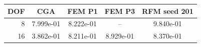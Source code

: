 \begin{tabular}{rcccc}
\toprule
DOF & CGA & FEM P1 & FEM P3 & RFM seed 201 \\
\midrule
8 & 7.999e-01 & 8.222e-01 & -- & 9.840e-01 \\
16 & 3.862e-01 & 8.211e-01 & 8.929e-01 & 8.370e-01 \\
\bottomrule
\end{tabular}
